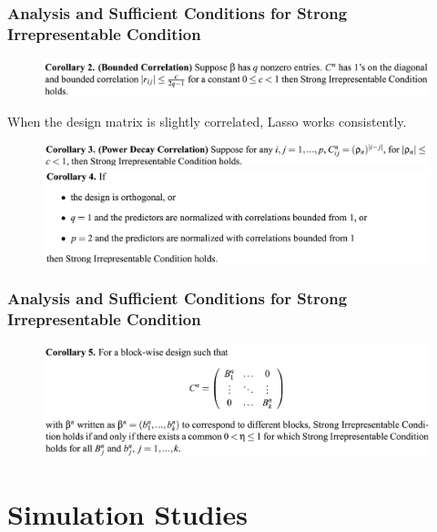 \documentclass{beamer}
\begin{document}
	\begin{frame}
		\frametitle{Analysis and Sufficient Conditions for Strong Irrepresentable Condition}
		\begin{figure}
			\includegraphics[width=1\linewidth]{image011.png}
		\end{figure}
		When the design matrix is slightly correlated, Lasso works consistently.
		\begin{figure}
			\includegraphics[width=1\linewidth]{image012.png}
			\includegraphics[width=1\linewidth]{image013.png}
		\end{figure}
	\end{frame}
	
	\begin{frame}
		\frametitle{Analysis and Sufficient Conditions for Strong Irrepresentable Condition}
		\begin{figure}
			\includegraphics[width=1\linewidth]{image014.png}
		\end{figure}	
	\end{frame}
	
	\section{Simulation Studies}
	
\end{document}
